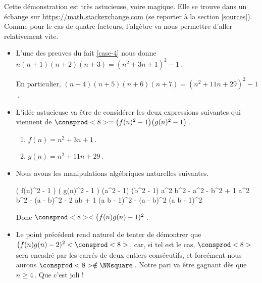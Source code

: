 Cette démonstration est très astucieuse, voire magique. Elle se trouve dans un échange sur \url{https://math.stackexchange.com} (se reporter à la section \ref{sources}).
Comme pour le cas de quatre facteurs, l'algèbre va nous permettre d'aller relativement vite.

\begin{itemize}
	\item L'une des preuves du fait \ref{case-4} nous donne
	$n (n + 1) (n + 2) (n + 3) = (n^2 + 3n + 1)^2 - 1$\,.

	\smallskip
	\noindent
	En particulier,
	$(n + 4)(n + 5)(n + 6)(n + 7) = (n^2 + 11 n + 29)^2 - 1$\,.


	\item L'idée astucieuse va être de considérer les deux expressions suivantes qui viennent de $\consprod<8> = \big( f(n)^2 - 1 \big) \big( g(n)^2 - 1 \big)$\,.
	\begin{enumerate}
		\item $f(n) = n^2 + 3n + 1$\,.

		\item $g(n) = n^2 + 11 n + 29$\,.
	\end{enumerate}


	\item Nous avons les manipulations algébriques naturelles suivantes.

	\medskip
    \noindent\kern-6pt%
    \begin{stepcalc}[style = sar]
    \explnext{}
    	\big( f(n)^2 - 1 \big) \big( g(n)^2 - 1 \big)
    	(a^2 - 1) (b^2 - 1)
    \explnext{}
    	a^2 b^2 - a^2 - b^2 + 1
    	a^2 b^2 - (a - b)^2 - 2 ab + 1
    \explnext{}
    	(a b  - 1)^2 - (a - b)^2
    	(a b  - 1)^2
    \end{stepcalc}
    
    \medskip
    
    \noindent
    Donc $\consprod<8> < \big( f(n) g(n) - 1)^2$\,.


	\item Le point précédent rend naturel de tenter de démontrer que 
	$\big( f(n) g(n) - 2)^2 < \consprod<8>$\,, car, si tel est le cas, 
	$\consprod<8>$ sera encadré par les carrés de deux entiers consécutifs, et forcément nous aurons $\consprod<8> \notin \NNsquare$\,. 
	Notre pari va être gagnant dès que $n \geq 4$\,.
	Que c'est joli !


\end{itemize}
